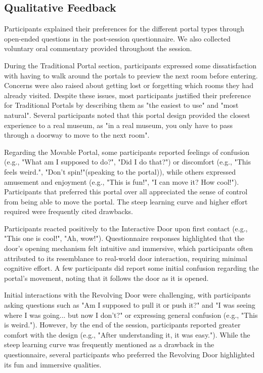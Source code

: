 \subsection{Qualitative Feedback}

Participants explained their preferences for the different portal types through 
open-ended questions in the post-session questionnaire. We also collected voluntary oral commentary provided throughout the session.

During the Traditional Portal section, participants expressed some dissatisfaction with having to walk around the portals to preview 
the next room before entering. Concerns were also raised about getting lost or forgetting which rooms they had already visited. 
Despite these issues, most participants justified their preference for Traditional Portals by describing them as "the easiest to use" 
and "most natural". Several participants noted that this portal design provided the closest experience to a real museum, as "in a real museum, 
you only have to pass through a doorway to move to the next room".

Regarding the Movable Portal, some participants reported feelings of confusion (e.g., "What am I supposed to do?", "Did I do that?") 
or discomfort (e.g., "This feels weird.", "Don't spin!"(speaking to the portal)), while others expressed amusement and enjoyment 
(e.g., "This is fun!", "I can move it? How cool!"). Participants that preferred this portal over all
appreciated the sense of control from being able to move the portal. The steep learning curve and higher effort required were frequently 
cited drawbacks.

Participants reacted positively to the Interactive Door upon first contact (e.g., "This one is cool!", "Ah, wow!"). 
Questionnaire responses highlighted that the door's opening mechanism felt intuitive and immersive, which participants often attributed 
to its resemblance to real-world door interaction, requiring minimal cognitive effort. A few participants did report some initial 
confusion regarding the portal's movement, noting that it follows the door as it is opened.

Initial interactions with the Revolving Door were challenging, with participants asking questions such as "Am I supposed to pull 
it or push it?" and "I was seeing where I was going... but now I don't?" or expressing general confusion (e.g., "This is weird."). 
However, by the end of the session, participants reported greater comfort with the design (e.g., "After understanding it, it was easy.").
While the steep learning curve was frequently mentioned as a drawback in the questionnaire, several participants who preferred the Revolving
Door highlighted its fun and immersive qualities.

